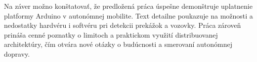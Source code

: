 Na záver možno konštatovať, že predložená práca úspešne demonštruje uplatnenie platformy Arduino v autonómnej mobilite. Text detailne poukazuje na možnosti a nedostatky hardvéru i softvéru pri detekcii prekážok a vozovky. Práca zároveň prináša cenné poznatky o limitoch a praktickom využití distribuovanej architektúry, čím otvára nové otázky o budúcnosti a smerovaní autonómnej dopravy.